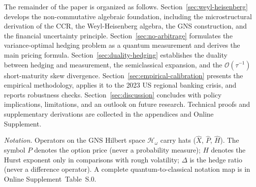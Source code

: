 The remainder of the paper is organized as follows.
Section~\ref{sec:weyl-heisenberg} develops the non-commutative algebraic
foundation, including the microstructural derivation of the CCR, the
Weyl-Heisenberg algebra, the GNS construction, and the financial uncertainty
principle. Section~\ref{sec:no-arbitrage} formulates the variance-optimal
hedging problem as a quantum measurement and derives the main pricing formula.
Section~\ref{sec:duality-hedging} establishes the duality between hedging and
measurement, the semiclassical expansion, and the $\mathcal{O}(\tau^{-1})$
short-maturity skew divergence.
Section~\ref{sec:empirical-calibration} presents the empirical methodology,
applies it to the 2023 US regional banking crisis, and reports robustness
checks. Section~\ref{sec:discussion} concludes with policy implications,
limitations, and an outlook on future research. Technical proofs and
supplementary derivations are collected in the appendices and Online Supplement.

\smallskip
\noindent\textit{Notation.}
Operators on the GNS Hilbert space $\mathcal{H}_\omega$ carry hats
($\hat{X}$, $\hat{P}$, $\hat{H}$). The symbol $P$ denotes the option price
(never a probability measure); $H$ denotes the Hurst exponent only in
comparisons with rough volatility; $\Delta$ is the hedge ratio (never a
difference operator). A complete quantum-to-classical notation map is in
Online Supplement~Table~S.0.
